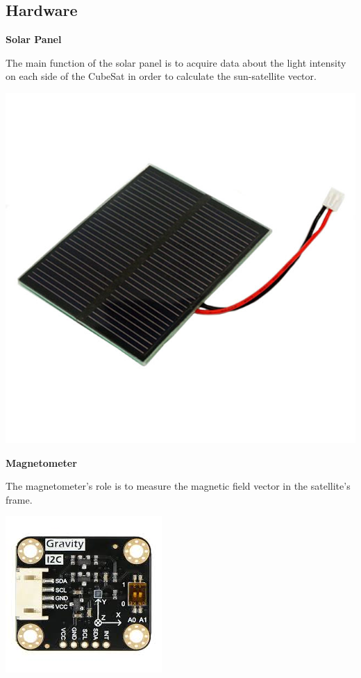 \documentclass[a4paper, 12pt]{article}
\begin{document}
\subsection{Hardware}

\begin{minipage}{0.55\textwidth}
\textbf{Solar Panel} 

The main function of the solar panel is to acquire data about the light intensity on each side of the CubeSat in order to calculate the sun-satellite vector.

\end{minipage}
\hfill
\begin{minipage}{0.4\textwidth}
    \centering
    \includegraphics[width=0.5\linewidth]{fig/solarPanel.jpg}
    \label{fig:Solar Panel}
\end{minipage}
\begin{minipage}{0.55\textwidth}
\textbf{Magnetometer} 

The magnetometer's role is to measure the magnetic field vector in the satellite's frame.

\end{minipage}
\hfill
\begin{minipage}{0.4\textwidth}
    \centering
    \includegraphics[width=0.5\linewidth]{fig/magnetometer.jpeg}
    \label{fig:Magnetometer}
\end{minipage}
\end{document}
